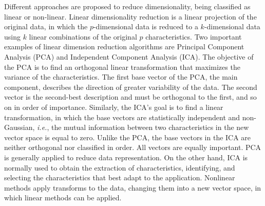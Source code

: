 \documentclass{ieeeaccess}
\begin{document}

Different approaches are proposed to reduce dimensionality, being classified as linear or non-linear. Linear dimensionality reduction is a linear projection of the original data, in which the $ p $-dimensional data is reduced to a $ k $-dimensional data using $ k $ linear combinations of the original $ p $ characteristics. Two important examples of linear dimension reduction algorithms are Principal Component Analysis (PCA) and Independent Component Analysis (ICA). The objective of the PCA is to find an orthogonal linear transformation that maximizes the variance of the characteristics. The first base vector of the PCA, the main component, describes the direction of greater variability of the data. The second vector is the second-best description and must be orthogonal to the first, and so on in order of importance. Similarly, the ICA's goal is to find a linear transformation, in which the base vectors are statistically independent and non-Gaussian, \textit{i.e.}, the mutual information between two characteristics in the new vector space is equal to zero. Unlike the PCA, the base vectors in the ICA are neither orthogonal nor classified in order. All vectors are equally important. PCA is generally applied to reduce data representation. On the other hand, ICA is normally used to obtain the extraction of characteristics, identifying, and selecting the characteristics that best adapt to the application. Nonlinear methods apply transforms to the data, changing them into a new vector space, in which linear methods can be applied.
\end{document}
